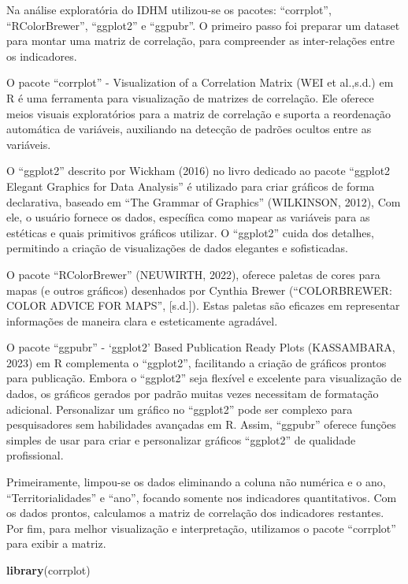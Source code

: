 \documentclass[
]{article}
\newenvironment{Shaded}{\begin{snugshade}}{\end{snugshade}}
\newcommand{\FunctionTok}[1]{\textcolor[rgb]{0.13,0.29,0.53}{\textbf{#1}}}
\newcommand{\NormalTok}[1]{#1}
\begin{document}
Na análise exploratória do IDHM utilizou-se os pacotes: ``corrplot'',
``RColorBrewer'', ``ggplot2'' e ``ggpubr''. O primeiro passo foi
preparar um dataset para montar uma matriz de correlação, para
compreender as inter-relações entre os indicadores.

O pacote ``corrplot'' - Visualization of a Correlation Matrix (WEI et
al.,s.d.) em R é uma ferramenta para visualização de matrizes de
correlação. Ele oferece meios visuais exploratórios para a matriz de
correlação e suporta a reordenação automática de variáveis, auxiliando
na detecção de padrões ocultos entre as variáveis.

O ``ggplot2'' descrito por Wickham (2016) no livro dedicado ao pacote
``ggplot2 Elegant Graphics for Data Analysis'' é utilizado para criar
gráficos de forma declarativa, baseado em ``The Grammar of Graphics''
(WILKINSON, 2012), Com ele, o usuário fornece os dados, específica como
mapear as variáveis para as estéticas e quais primitivos gráficos
utilizar. O ``ggplot2'' cuida dos detalhes, permitindo a criação de
visualizações de dados elegantes e sofisticadas.

O pacote ``RColorBrewer'' (NEUWIRTH, 2022), oferece paletas de cores
para mapas (e outros gráficos) desenhados por Cynthia Brewer
(``COLORBREWER: COLOR ADVICE FOR MAPS'', {[}s.d.{]}). Estas paletas são
eficazes em representar informações de maneira clara e esteticamente
agradável.

O pacote ``ggpubr'' - `ggplot2' Based Publication Ready Plots
(KASSAMBARA, 2023) em R complementa o ``ggplot2'', facilitando a criação
de gráficos prontos para publicação. Embora o ``ggplot2'' seja flexível
e excelente para visualização de dados, os gráficos gerados por padrão
muitas vezes necessitam de formatação adicional. Personalizar um gráfico
no ``ggplot2'' pode ser complexo para pesquisadores sem habilidades
avançadas em R. Assim, ``ggpubr'' oferece funções simples de usar para
criar e personalizar gráficos ``ggplot2'' de qualidade profissional.

Primeiramente, limpou-se os dados eliminando a coluna não numérica e o
ano, ``Territorialidades'' e ``ano'', focando somente nos indicadores
quantitativos. Com os dados prontos, calculamos a matriz de correlação
dos indicadores restantes. Por fim, para melhor visualização e
interpretação, utilizamos o pacote ``corrplot'' para exibir a matriz.

\begin{Shaded}
\begin{Highlighting}[]
\FunctionTok{library}\NormalTok{(corrplot)}
\end{Highlighting}
\end{Shaded}
\end{document}
